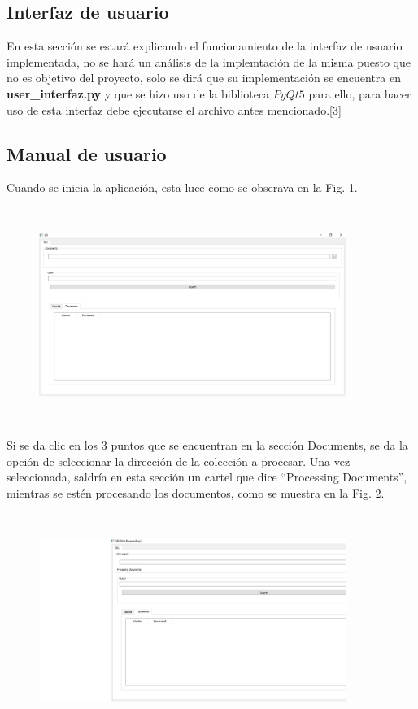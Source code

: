 \documentclass{llncs}
\begin{document}
\subsection{Interfaz de usuario}
En esta secci\'on se estar\'a explicando el funcionamiento de la interfaz de usuario implementada, no se har\'a un an\'alisis de la implemtaci\'on de la misma puesto que no es objetivo del proyecto, solo se dir\'a que su implementaci\'on se encuentra en \textbf{user\_interfaz.py} y que se hizo uso de la biblioteca $PyQt5$ para ello, para hacer uso de esta interfaz debe ejecutarse el archivo antes mencionado.[3]\\

\subsection{Manual de usuario}

Cuando se inicia la aplicaci\'on, esta luce como se obserava en la Fig. 1.\\

\begin{figure}
	\centering
	\includegraphics[width = 10cm, height = 7cm]{app/inicializando.jpg}
	\caption{}
\end{figure}

Si se da clic en los 3 puntos que se encuentran en la secci\'on Documents, se da la opci\'on de seleccionar la direcci\'on de la colecci\'on a procesar. Una vez seleccionada, saldr\'ia en esta secci\'on un cartel que dice ``Processing Documents'', mientras se est\'en procesando los documentos, como se muestra en la Fig. 2.\\

\begin{figure}
	\centering
	\includegraphics[width = 10cm, height = 7cm]{app/processing.jpg}
	\caption{}
\end{figure}
\end{document}
